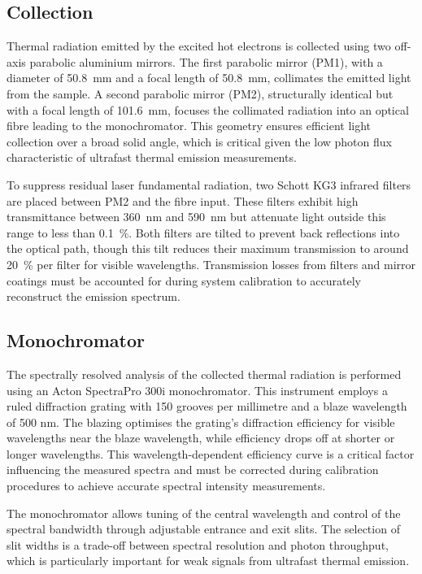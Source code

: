 \documentclass[
	parskip=half,
	a4paper,
]{scrarticle}
\begin{document}
\subsection{Collection}
Thermal radiation emitted by the excited hot electrons is collected using two off-axis parabolic aluminium mirrors. The first parabolic mirror (PM1), with a diameter of \SI{50.8}{\milli\meter} and a focal length of \SI{50.8}{\milli\meter}, collimates the emitted light from the sample. A second parabolic mirror (PM2), structurally identical but with a focal length of \SI{101.6}{\milli\meter}, focuses the collimated radiation into an optical fibre leading to the monochromator. This geometry ensures efficient light collection over a broad solid angle, which is critical given the low photon flux characteristic of ultrafast thermal emission measurements.

To suppress residual laser fundamental radiation, two Schott KG3 infrared filters are placed between PM2 and the fibre input. These filters exhibit high transmittance between \SI{360}{\nano\meter} and \SI{590}{\nano\meter} but attenuate light outside this range to less than \SI{0.1}{\percent}. Both filters are tilted to prevent back reflections into the optical path, though this tilt reduces their maximum transmission to around \SI{20}{\percent} per filter for visible wavelengths. Transmission losses from filters and mirror coatings must be accounted for during system calibration to accurately reconstruct the emission spectrum.

\subsection{Monochromator}
The spectrally resolved analysis of the collected thermal radiation is performed using an Acton SpectraPro 300i monochromator. This instrument employs a ruled diffraction grating with 150 grooves per millimetre and a blaze wavelength of 500 nm. The blazing optimises the grating's diffraction efficiency for visible wavelengths near the blaze wavelength, while efficiency drops off at shorter or longer wavelengths. This wavelength-dependent efficiency curve is a critical factor influencing the measured spectra and must be corrected during calibration procedures to achieve accurate spectral intensity measurements.

The monochromator allows tuning of the central wavelength and control of the spectral bandwidth through adjustable entrance and exit slits. The selection of slit widths is a trade-off between spectral resolution and photon throughput, which is particularly important for weak signals from ultrafast thermal emission.
\end{document}
